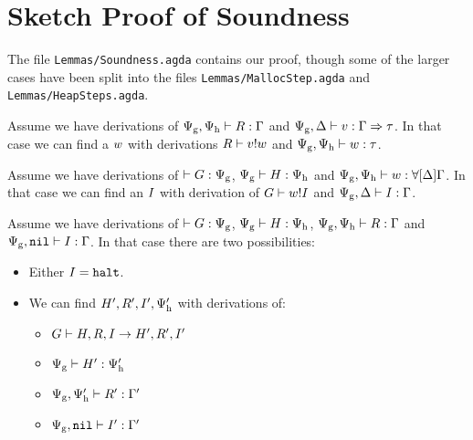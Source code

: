 \appendix
\chapter{Sketch Proof of Soundness}
\label{sec:soundness-proof}

The file \texttt{Lemmas/Soundness.agda} contains our proof, though some of the
larger cases have been split into the files \texttt{Lemmas/MallocStep.agda} and
\texttt{Lemmas/HeapSteps.agda}.


\begin{lemma}
  Assume we have derivations of
  ${\Psi_{\mathrm{g}},\Psi_{\mathrm{h}}} |- {R} : {\Gamma}$ and
  ${\Psi_{\mathrm{g}},\Delta} |- {v} : {\Gamma => \tau}$. In that case we
  can find a $w$ with derivations ${R} |- {v} ! {w}$
  and ${\Psi_{\mathrm{g}},\Psi_{\mathrm{h}}} |- {w} : {\tau}$.
\end{lemma}

\begin{lemma}
  Assume we have derivations of $|- {G} : {\Psi_{\mathrm{g}}}$,
  ${\Psi_{\mathrm{g}}} |- {H} : {\Psi_{\mathrm{h}}}$ and
  ${\Psi_{\mathrm{g}},\Psi_{\mathrm{h}}} |- {w} : {\forall[ \Delta ]
    \Gamma}$. In that case we can find an $I$ with derivation of
  ${G} |- {w} ! {I}$ and
  ${\Psi_{\mathrm{g}}, \Delta} |- {I} : {\Gamma}$.
\end{lemma}

\begin{lemma}
  Assume we have derivations of $|- {G} : {\Psi_{\mathrm{g}}}$,
  ${\Psi_{\mathrm{g}}} |- {H} : {\Psi_{\mathrm{h}}}$,
  ${\Psi_{\mathrm{g}},\Psi_{\mathrm{h}}} |- {R} : {\Gamma}$ and
  ${\Psi_{\mathrm{g}}, \mathtt{nil}} |- {I} : {\Gamma}$. In that case
  there are two possibilities:
  \begin{itemize}
  \item Either $I = \mathtt{halt}$.
  \item We can find $H', R', I', \Psi_{\mathrm{h}}'$ with
    derivations of:
    \begin{itemize}
    \item ${G} |- {H, R, I} -> {H', R', I'}$
    \item ${\Psi_{\mathrm{g}}} |- {H'} : {\Psi_{\mathrm{h}}'}$
    \item ${\Psi_{\mathrm{g}},\Psi_{\mathrm{h}}'} |- {R'} : {\Gamma'}$
    \item ${\Psi_{\mathrm{g}}, \mathtt{nil}} |- {I'} : {\Gamma'}$
    \end{itemize}
  \end{itemize}
\end{lemma}

